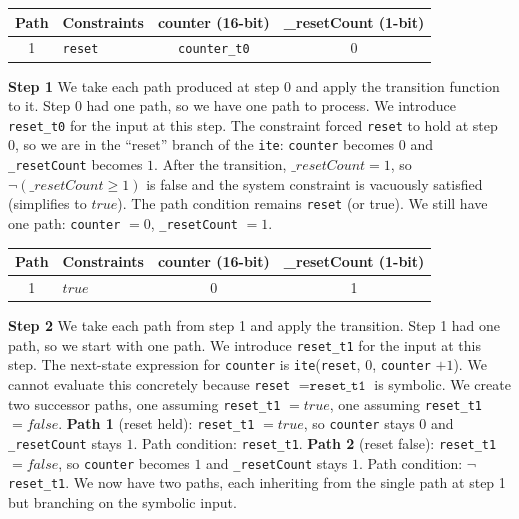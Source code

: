 \documentclass[11pt]{article}
\begin{document}
\begin{center}
\begin{tabular}{|c|l|c|c|}
\hline
\textbf{Path} & \textbf{Constraints} & \textbf{counter (16-bit)} & \textbf{\_resetCount (1-bit)} \\
\hline
1 & \texttt{reset} & \texttt{counter\_t0} & 0 \\
\hline
\end{tabular}
\end{center}

\textbf{Step 1} We take each path produced at step 0 and apply the transition function to it. Step 0 had one path, so we have one path to process. We introduce \texttt{reset\_t0} for the input at this step. The constraint forced \texttt{reset} to hold at step 0, so we are in the ``reset'' branch of the \texttt{ite}: \texttt{counter} becomes $0$ and \texttt{\_resetCount} becomes $1$. After the transition, $\mathit{\_resetCount} = 1$, so $\neg(\mathit{\_resetCount} \geq 1)$ is false and the system constraint is vacuously satisfied (simplifies to $\mathit{true}$). The path condition remains \texttt{reset} (or true). We still have one path: \texttt{counter} $= 0$, \texttt{\_resetCount} $= 1$.

\begin{center}
\begin{tabular}{|c|l|c|c|}
\hline
\textbf{Path} & \textbf{Constraints} & \textbf{counter (16-bit)} & \textbf{\_resetCount (1-bit)} \\
\hline
1 & $\mathit{true}$ & 0 & 1 \\
\hline
\end{tabular}
\end{center}

\textbf{Step 2} We take each path from step 1 and apply the transition. Step 1 had one path, so we start with one path. We introduce \texttt{reset\_t1} for the input at this step. The next-state expression for \texttt{counter} is \texttt{ite}(\texttt{reset}, $0$, \texttt{counter} $+ 1$). We cannot evaluate this concretely because \texttt{reset} $= \texttt{reset\_t1}$ is symbolic. We create two successor paths, one assuming \texttt{reset\_t1} $= \mathit{true}$, one assuming \texttt{reset\_t1} $= \mathit{false}$. \textbf{Path 1} (reset held): \texttt{reset\_t1} $= \mathit{true}$, so \texttt{counter} stays $0$ and \texttt{\_resetCount} stays $1$. Path condition: \texttt{reset\_t1}. \textbf{Path 2} (reset false): \texttt{reset\_t1} $= \mathit{false}$, so \texttt{counter} becomes $1$ and \texttt{\_resetCount} stays $1$. Path condition: $\neg$\texttt{reset\_t1}. We now have two paths, each inheriting from the single path at step 1 but branching on the symbolic input.
\end{document}
